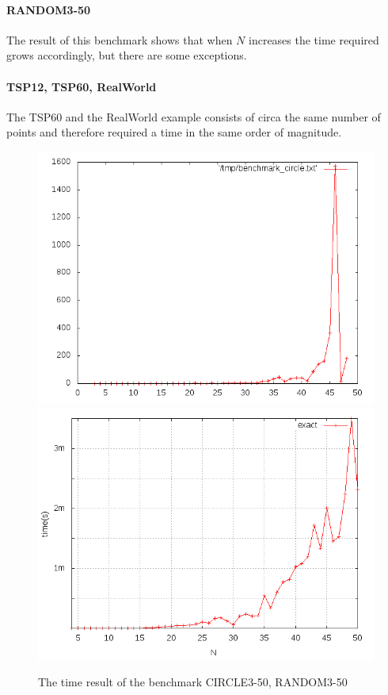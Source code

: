 \paragraph{RANDOM3-50}
The result of this benchmark shows that when $N$ increases the time required
grows accordingly, but there are some exceptions.

\paragraph{TSP12, TSP60, RealWorld}
The TSP60 and the RealWorld example consists of circa the same number of points and
therefore required a time in the same order of magnitude.


\begin{figure}
	\centering
	\includegraphics[scale=0.4]{img/benchmark_circle.png}
	\includegraphics[scale=0.4]{img/firstAssignment/RANDOMTSPINSTANCE.png}
	\caption{The time result of the benchmark CIRCLE3-50, RANDOM3-50}
\end{figure}
